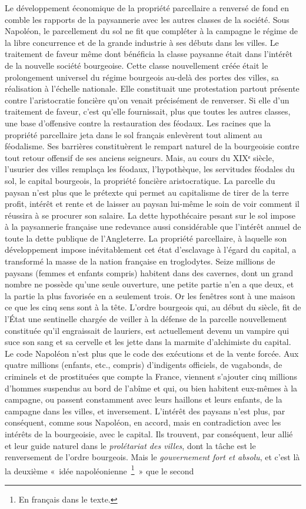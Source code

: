 \documentclass[french,twoside]{book} %
\begin{document}
Le développement économique de la propriété parcellaire a renversé de fond en comble les rapports de la paysannerie avec les autres classes de la société. Sous Napoléon, le parcellement du sol ne fit que compléter à la campagne le régime de la libre concurrence et de la grande industrie à ses débuts dans les villes. Le traitement de faveur même dont bénéficia la classe paysanne était dans l’intérêt de la nouvelle société bourgeoise. Cette classe nouvellement créée était le prolongement universel du régime bourgeois au-delà des portes des villes, sa réalisation à l’échelle nationale. Elle constituait une protestation partout présente contre l’aristocratie foncière qu’on venait précisément de renverser. Si elle d’un traitement de faveur, c’est qu’elle fournissait, plus que toutes les autres classes, une base d’offensive contre la restauration des féodaux. Les racines que la propriété parcellaire jeta dans le sol français enlevèrent tout aliment au féodalisme. Ses barrières constituèrent le rempart naturel de la bourgeoisie contre tout retour offensif de ses anciens seigneurs. Mais, au cours du XIXᵉ siècle, l’usurier des villes remplaça les féodaux, l’hypothèque, les servitudes féodales du sol, le capital bourgeois, la propriété foncière aristocratique. La parcelle du paysan n’est plus que le prétexte qui permet au capitalisme de tirer de la terre profit, intérêt et rente et de laisser au paysan lui-même le soin de voir comment il réussira à se procurer son salaire. La dette hypothécaire pesant sur le sol impose à la paysannerie française une redevance aussi considérable que l’intérêt annuel de toute la dette publique de l’Angleterre. La propriété parcellaire, à laquelle son développement impose inévitablement cet état d’esclavage à l’égard du capital, a transformé la masse de la nation française en troglodytes. Seize millions de paysans (femmes et enfants compris) habitent dans des cavernes, dont un grand nombre ne possède qu’une seule ouverture, une petite partie n’en a que deux, et la partie la plus favorisée en a seulement trois. Or les fenêtres sont à une maison ce que les cinq sens sont à la tête. L’ordre bourgeois qui, au début du siècle, fit de l’État une sentinelle chargée de veiller à la défense de la parcelle nouvellement constituée qu’il engraissait de lauriers, est actuellement devenu un vampire qui suce son sang et sa cervelle et les jette dans la marmite d’alchimiste du capital. Le code Napoléon n’est plus que le code des exécutions et de la vente forcée. Aux quatre millions (enfants, etc., compris) d’indigents officiels, de vagabonds, de criminels et de prostituées que compte la France, viennent s’ajouter cinq millions d’hommes suspendus au bord de l’abîme et qui, ou bien habitent eux-mêmes à la campagne, ou passent constamment avec leurs haillons et leurs enfants, de la campagne dans les villes, et inversement. L’intérêt des paysans n’est plus, par conséquent, comme sous Napoléon, en accord, mais en contradiction avec les intérêts de la bourgeoisie, avec le capital. Ils trouvent, par conséquent, leur allié et leur guide naturel dans le \emph{prolétariat des villes}, dont la tâche est le renversement de l’ordre bourgeois. Mais le \emph{gouvernement fort et absolu}, et c’est là la deuxième « idée napoléonienne \footnote{En français dans le texte.} » que le second 
\end{document}
